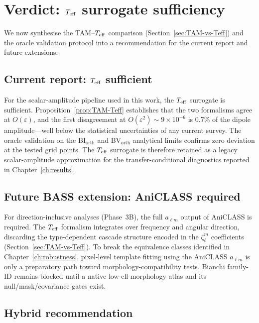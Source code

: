\section{Verdict: $T_{\mathrm{eff}}$ surrogate sufficiency}
\label{sec:Teff-verdict}

We now synthesise the TAM--$T_{\mathrm{eff}}$ comparison
(Section~\ref{sec:TAM-vs-Teff}) and the oracle validation
protocol into a recommendation for the
current report and future extensions.

\subsection{Current report: $T_{\mathrm{eff}}$ sufficient}

For the scalar-amplitude pipeline used in this work, the
$T_{\mathrm{eff}}$ surrogate is sufficient.
Proposition~\ref{prop:TAM-Teff} establishes that the two
formalisms agree at $O(\varepsilon)$, and the first
disagreement at $O(\varepsilon^2) \sim 9 \times 10^{-6}$
is $0.7\%$ of the dipole amplitude---well below the
statistical uncertainties of any current survey.  The oracle
validation on the BI$_{\mathrm{orth}}$ and BV$_{\mathrm{orth}}$
analytical limits confirms zero deviation at the tested
grid points.  The $T_{\mathrm{eff}}$ surrogate is therefore retained as a
legacy scalar-amplitude approximation for the transfer-conditional
diagnostics reported in Chapter~\ref{ch:results}.

\subsection{Future BASS extension: AniCLASS required}

For direction-inclusive analyses (Phase~3B), the full
$a_{\ell m}$ output of AniCLASS is required.  The $T_{\mathrm{eff}}$
formalism integrates over frequency and angular direction,
discarding the type-dependent cascade structure encoded in the
$\zeta^m_\ell$ coefficients (Section~\ref{sec:TAM-vs-Teff}).
To break the equivalence classes identified in
Chapter~\ref{ch:robustness}, pixel-level template fitting using
the AniCLASS $a_{\ell m}$ is only a preparatory path toward
morphology-compatibility tests.  Bianchi family-ID remains blocked
until a native low-ell morphology atlas and its null/mask/covariance
gates exist.

\subsection{Hybrid recommendation}

